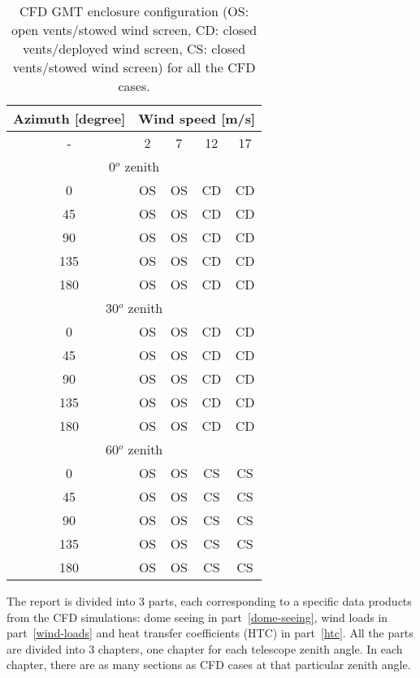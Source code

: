 \begin{table}
  \centering
  \begin{tabular}{c|cccc}\toprule
    Azimuth [degree] & \multicolumn{4}{c}{Wind speed [m/s]} \\\hline
     - & 2 & 7  & 12 & 17 \\\midrule
    \multicolumn{5}{c}{0$^o$ zenith}\\\hline
      0               & OS   & OS & CD    & CD        \\
     45               & OS   & OS & CD    & CD        \\
     90               & OS   & OS & CD    & CD        \\
    135               & OS   & OS & CD    & CD        \\
    180               & OS   & OS & CD    & CD        \\\hline
    \multicolumn{5}{c}{30$^o$ zenith}\\\hline
      0               & OS   & OS & CD    & CD        \\
     45               & OS   & OS & CD    & CD        \\
     90               & OS   & OS & CD    & CD        \\
    135               & OS   & OS & CD    & CD        \\
    180               & OS   & OS & CD    & CD        \\\hline
    \multicolumn{5}{c}{60$^o$ zenith}\\\hline
      0               & OS   & OS & CS    & CS        \\
     45               & OS   & OS & CS    & CS        \\
     90               & OS   & OS & CS    & CS        \\
    135               & OS   & OS & CS    & CS        \\
    180               & OS   & OS & CS    & CS        \\
    \bottomrule
  \end{tabular}
  \caption[CFD GMT enclosure configuration]{CFD GMT enclosure configuration
   (OS: open vents/stowed wind screen, 
   CD: closed vents/deployed wind screen, 
   CS: closed vents/stowed wind screen) for all the CFD cases.}
  \label{tab:cases}
\end{table}

The report is divided into 3 parts, each corresponding to a specific data products from the CFD simulations: dome seeing in part~\ref{dome-seeing}, wind loads in part~\ref{wind-loads} and heat transfer coefficients (HTC) in part~\ref{htc}.
All the parts are divided into 3 chapters, one chapter for each telescope zenith angle.
In each chapter, there are as many sections as CFD cases at that particular zenith angle.

